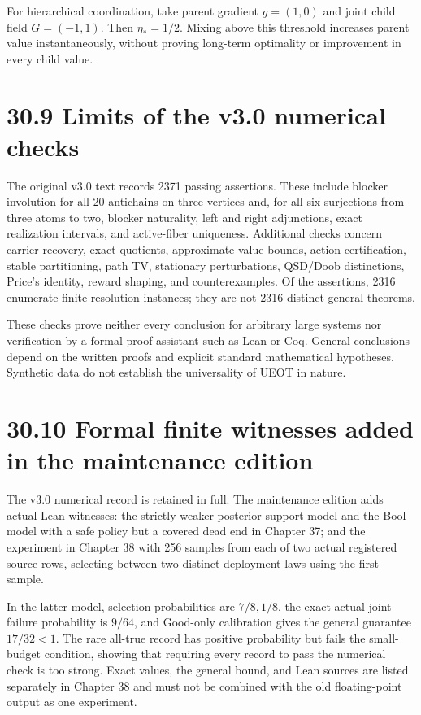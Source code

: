 \documentclass[
  english,
  11pt,
  oneside]{book}
\begin{document}
For hierarchical coordination, take parent gradient \(g=(1,0)\) and joint child field \(G=(-1,1)\). Then \(\eta_*=1/2\). Mixing above this threshold increases parent value instantaneously, without proving long-term optimality or improvement in every child value.

\section{30.9 Limits of the v3.0 numerical checks}\label{limits-of-the-v3.0-numerical-checks}

The original v3.0 text records 2371 passing assertions. These include blocker involution for all 20 antichains on three vertices and, for all six surjections from three atoms to two, blocker naturality, left and right adjunctions, exact realization intervals, and active-fiber uniqueness. Additional checks concern carrier recovery, exact quotients, approximate value bounds, action certification, stable partitioning, path TV, stationary perturbations, QSD/Doob distinctions, Price's identity, reward shaping, and counterexamples. Of the assertions, 2316 enumerate finite-resolution instances; they are not 2316 distinct general theorems.

These checks prove neither every conclusion for arbitrary large systems nor verification by a formal proof assistant such as Lean or Coq. General conclusions depend on the written proofs and explicit standard mathematical hypotheses. Synthetic data do not establish the universality of UEOT in nature.

\section{30.10 Formal finite witnesses added in the maintenance edition}\label{formal-finite-witnesses-added-in-the-maintenance-edition}

The v3.0 numerical record is retained in full. The maintenance edition adds actual Lean witnesses: the strictly weaker posterior-support model and the Bool model with a safe policy but a covered dead end in Chapter 37; and the experiment in Chapter 38 with 256 samples from each of two actual registered source rows, selecting between two distinct deployment laws using the first sample.

In the latter model, selection probabilities are \(7/8,1/8\), the exact actual joint failure probability is \(9/64\), and Good-only calibration gives the general guarantee \(17/32<1\). The rare all-true record has positive probability but fails the small-budget condition, showing that requiring every record to pass the numerical check is too strong. Exact values, the general bound, and Lean sources are listed separately in Chapter 38 and must not be combined with the old floating-point output as one experiment.
\end{document}
